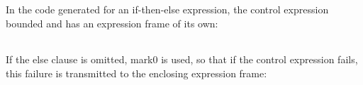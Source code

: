 \begin{noIndex}
In the code generated for an if-then-else expression, the control
expression bounded and has an expression frame of its own:

\begin{center}
\tablelasttail{\hline}
\begin{xtabular}{|m{1.9073598in}|m{2.75596in}|}

\end{xtabular}
\end{center}

If the else clause is omitted, mark0 is used, so that if the control
expression fails, this failure is transmitted to the enclosing
expression frame:

\begin{center}
\tablelasttail{\hline}
\begin{xtabular}{|m{1.9073598in}|m{2.75596in}|}

\end{xtabular}
\end{center}


\end{noIndex}
